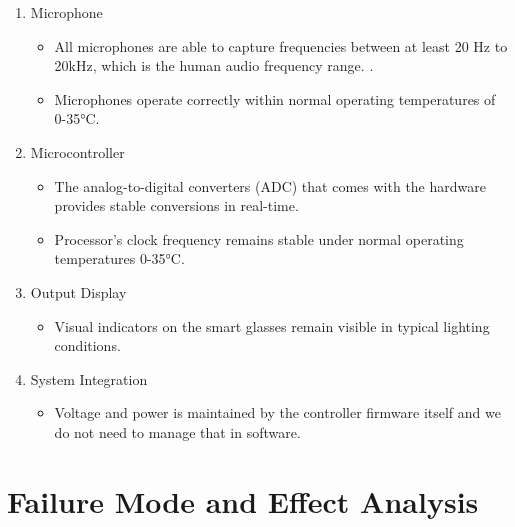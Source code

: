 \documentclass{article}
\begin{document}
\begin{enumerate}
    \item Microphone
    \begin{itemize}
        \item All microphones are able to capture frequencies between at least
        20 Hz to 20kHz, which is the human audio frequency range.
        \cite{Neuroscience2001}.
        \item Microphones operate correctly within normal operating temperatures
        of 0-35°C. 
    \end{itemize}
    
    \item Microcontroller
    \begin{itemize}
        \item The analog-to-digital converters (ADC) that comes with the
        hardware provides stable conversions in real-time.
        \item Processor's clock frequency remains stable under normal operating
        temperatures 0-35°C.
    \end{itemize}

    \item Output Display
    \begin{itemize}
        \item Visual indicators on the smart glasses remain visible in typical
        lighting conditions. 
    \end{itemize}

    \item System Integration
    \begin{itemize}
        \item Voltage and power is maintained by the controller firmware itself
        and we do not need to manage that in software. 
    \end{itemize}
    
\end{enumerate}

\section{Failure Mode and Effect Analysis}
\end{document}
